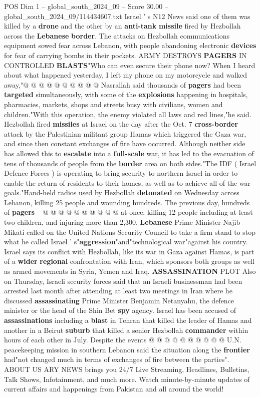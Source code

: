 \begin{textsample}{POS Dim 1 – global\_south\_2024\_09 – Score 30.00 – global\_south\_2024\_09/114434607.txt}
Israel ' s N12 News said one of them was killed by a \textbf{drone} and the other by an \textbf{anti-tank} \textbf{missile} fired by Hezbollah across the \textbf{Lebanese} \textbf{border}.
The attacks on Hezbollah communications equipment sowed fear across Lebanon, with people abandoning electronic \textbf{devices} for fear of carrying bombs in their pockets.
ARMY DESTROYS \textbf{PAGERS} IN CONTROLLED \textbf{BLASTS}"Who can even secure their phone now?
When I heard about what happened yesterday, I left my phone on my motorcycle and walked away,"@ @ @ @ @ @ @ @ @ @ Nasrallah said thousands of \textbf{pagers} had been \textbf{targeted} simultaneously, with some of the \textbf{explosions} happening in hospitals, pharmacies, markets, shops and streets busy with civilians, women and children."With this operation, the enemy violated all laws and red lines,"he said.
Hezbollah fired \textbf{missiles} at Israel on the day after the Oct. 7 \textbf{cross-border} attack by the Palestinian militant group Hamas which triggered the Gaza war, and since then constant exchanges of fire have occurred.
Although neither side has allowed this to \textbf{escalate} into a \textbf{full-scale} war, it has led to the evacuation of tens of thousands of people from the \textbf{border} area on both sides."The IDF ( Israel Defence Forces ) is operating to bring security to northern Israel in order to enable the return of residents to their homes, as well as to achieve all of the war goals."Hand-held radios used by Hezbollah \textbf{detonated} on Wednesday across Lebanon, killing 25 people and wounding hundreds.
The previous day, hundreds of \textbf{pagers} -- @ @ @ @ @ @ @ @ @ @ at once, killing 12 people including at least two children, and injuring more than 2,300. \textbf{Lebanese} Prime Minister Najib Mikati called on the United Nations Security Council to take a firm stand to stop what he called Israel ' s"\textbf{aggression}"and"technological war"against his country.
Israel says its conflict with Hezbollah, like its war in Gaza against Hamas, is part of a \textbf{wider} \textbf{regional} confrontation with Iran, which sponsors both groups as well as armed movements in Syria, Yemen and Iraq. \textbf{ASSASSINATION} PLOT Also on Thursday, Israeli security forces said that an Israeli businessman had been arrested last month after attending at least two meetings in Iran where he discussed \textbf{assassinating} Prime Minister Benjamin Netanyahu, the defence minister or the head of the Shin Bet \textbf{spy} agency.
Israel has been accused of \textbf{assassinations} including a \textbf{blast} in Tehran that killed the leader of Hamas and another in a Beirut \textbf{suburb} that killed a senior Hezbollah \textbf{commander} within hours of each other in July.
Despite the events @ @ @ @ @ @ @ @ @ @ U.N. peacekeeping mission in southern Lebanon said the situation along the \textbf{frontier} had"not changed much in terms of exchanges of fire between the parties".
ABOUT US ARY NEWS brings you 24/7 Live Streaming, Headlines, Bulletins, Talk Shows, Infotainment, and much more.
Watch minute-by-minute updates of current affairs and happenings from Pakistan and all around the world!


\end{textsample}
